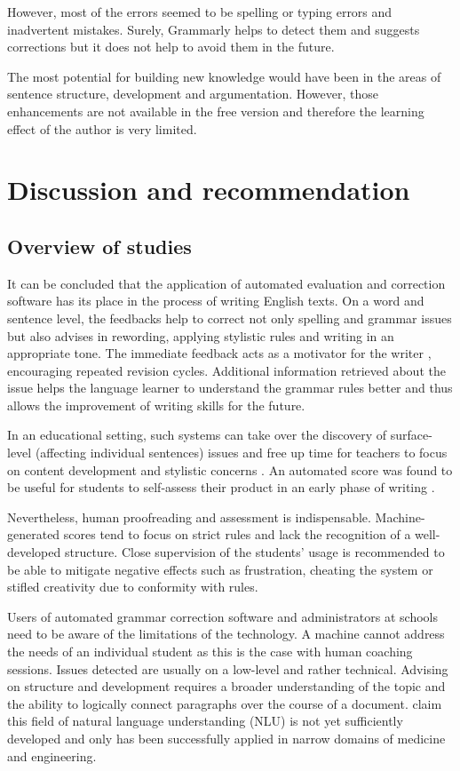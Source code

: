\documentclass[runningheads]{llncs}
\let\OldTextregistered\textregistered
\renewcommand{\textregistered}{\OldTextregistered\xspace}
\begin{document}
However, most of the errors seemed to be spelling or typing errors and inadvertent mistakes. Surely, Grammarly\textregistered helps to detect them and suggests corrections but it does not help to avoid them in the future.

The most potential for building new knowledge would have been in the areas of sentence structure, development and argumentation. However, those enhancements are not available in the free version and therefore the learning effect of the author is very limited.

\section{Discussion and recommendation}
\subsection{Overview of studies}
It can be concluded that the application of automated evaluation and correction software has its place in the process of writing English texts. On a word and sentence level, the feedbacks help to correct not only spelling and grammar issues but also advises in rewording, applying stylistic rules and writing in an appropriate tone. The immediate feedback acts as a motivator for the writer \citep{grimes_utility_2010}, encouraging repeated revision cycles. Additional information retrieved about the issue helps the language learner to understand the grammar rules better and thus allows the improvement of writing skills for the future. 

In an educational setting, such systems can take 
over the discovery of surface-level (affecting individual sentences) issues and free up time for teachers to focus on content development and stylistic concerns \citep{dembsey_closing_2017}. An automated score was found to be useful for students to self-assess their product in an early phase of writing \citep{grimes_utility_2010}. 

Nevertheless, human proofreading and assessment is indispensable. Machine-generated scores tend to focus on strict rules and lack the recognition of a well-developed structure. Close supervision of the students' usage is recommended to be able to mitigate negative effects such as frustration, cheating the system or stifled creativity due to conformity with rules.

Users of automated grammar correction software and administrators at schools need to be aware of the limitations of the technology. A machine cannot address the needs of an individual student as this is the case with human coaching sessions. Issues detected are usually on a low-level and rather technical. Advising on structure and development requires a broader understanding of the topic and the ability to logically connect paragraphs over the course of a document. \textcite{grimes_utility_2010} claim this field of natural language understanding (NLU) is not yet sufficiently developed and only has been successfully applied in narrow domains of medicine and engineering.
\end{document}
